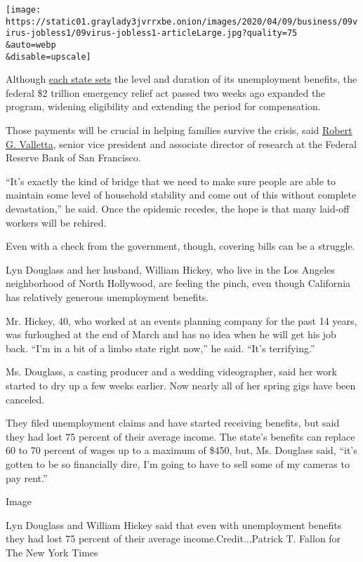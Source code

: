 \texttt{[image: https://static01.graylady3jvrrxbe.onion/images/2020/04/09/business/09virus-jobless1/09virus-jobless1-articleLarge.jpg?quality=75\\\&auto=webp\\\&disable=upscale]}

Although
\href{https://oui.doleta.gov/unemploy/pdf/uilawcompar/2019/complete.pdf}{each
state sets} the level and duration of its unemployment benefits, the
federal \$2 trillion emergency relief act passed two weeks ago expanded
the program, widening eligibility and extending the period for
compensation.

Those payments will be crucial in helping families survive the crisis,
said
\href{https://www.frbsf.org/economic-research/economists/robert-valletta/}{Robert
G. Valletta}, senior vice president and associate director of research
at the Federal Reserve Bank of San Francisco.

``It's exactly the kind of bridge that we need to make sure people are
able to maintain some level of household stability and come out of this
without complete devastation,'' he said. Once the epidemic recedes, the
hope is that many laid-off workers will be rehired.

Even with a check from the government, though, covering bills can be a
struggle.

Lyn Douglass and her husband, William Hickey, who live in the Los
Angeles neighborhood of North Hollywood, are feeling the pinch, even
though California has relatively generous unemployment benefits.

Mr. Hickey, 40, who worked at an events planning company for the past 14
years, was furloughed at the end of March and has no idea when he will
get his job back. ``I'm in a bit of a limbo state right now,'' he said.
``It's terrifying.''

Ms. Douglass, a casting producer and a wedding videographer, said her
work started to dry up a few weeks earlier. Now nearly all of her spring
gigs have been canceled.

They filed unemployment claims and have started receiving benefits, but
said they had lost 75 percent of their average income. The state's
benefits can replace 60 to 70 percent of wages up to a maximum of \$450,
but, Ms. Douglass said, ``it's gotten to be so financially dire, I'm
going to have to sell some of my cameras to pay rent.''

Image

Lyn Douglass and William Hickey said that even with unemployment
benefits they had lost 75 percent of their average
income.Credit...Patrick T. Fallon for The New York Times

